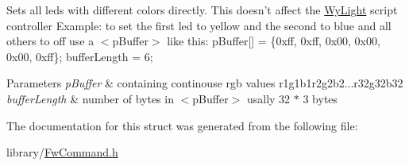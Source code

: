 Sets all leds with different colors directly. This doesn't affect the \hyperlink{namespace_wy_light}{Wy\-Light} script controller Example\-: to set the first led to yellow and the second to blue and all others to off use a $<$p\-Buffer$>$ like this\-: p\-Buffer\mbox{[}\mbox{]} = \{0xff, 0xff, 0x00, 0x00, 0x00, 0xff\}; buffer\-Length = 6; 
\begin{DoxyParams}{Parameters}
{\em p\-Buffer} & containing continouse rgb values r1g1b1r2g2b2...r32g32b32 \\
\hline
{\em buffer\-Length} & number of bytes in $<$p\-Buffer$>$ usally 32 $\ast$ 3 bytes \\
\hline
\end{DoxyParams}


The documentation for this struct was generated from the following file\-:\begin{DoxyCompactItemize}
\item 
library/\hyperlink{_fw_command_8h}{Fw\-Command.\-h}\end{DoxyCompactItemize}
